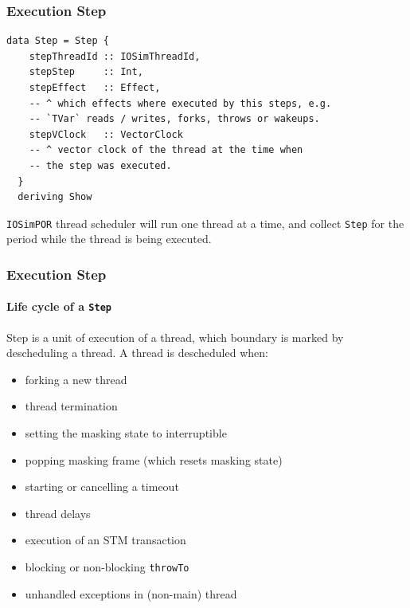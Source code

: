 \documentclass[t,x11names,xcolor={x11names},hyperref={colorlinks,citecolor=Blue4,linkcolor=Blue4,anchorcolor=Blue4,urlcolor=Blue4}]{beamer}
\begin{document}
\begin{frame}[fragile]
  \frametitle{Execution Step}
  \begin{verbatim}
data Step = Step {
    stepThreadId :: IOSimThreadId,
    stepStep     :: Int,
    stepEffect   :: Effect,
    -- ^ which effects where executed by this steps, e.g.
    -- `TVar` reads / writes, forks, throws or wakeups.
    stepVClock   :: VectorClock
    -- ^ vector clock of the thread at the time when
    -- the step was executed.
  }
  deriving Show
  \end{verbatim}

  \texttt{IOSimPOR} thread scheduler will run one thread at a time, and collect
  \texttt{Step} for the period while the thread is being executed.
\end{frame}

\begin{frame}
  \frametitle{Execution Step}
  \framesubtitle{Life cycle of a \texttt{Step}}
  Step is a unit of execution of a thread, which boundary is marked by
  descheduling a thread.  A thread is descheduled when:
  \begin{itemize}
    \item forking a new thread
    \item thread termination
    \item setting the masking state to interruptible
    \item popping masking frame (which resets masking state)
    \item starting or cancelling a timeout
    \item thread delays
    \item execution of an STM transaction
    \item blocking or non-blocking \texttt{throwTo}
    \item unhandled exceptions in (non-main) thread
  \end{itemize}
\end{frame}
\end{document}
